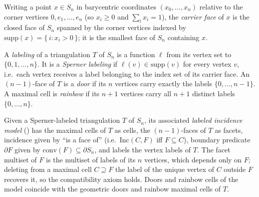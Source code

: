 \begin{definition}
    \label{def:carrier-face}
    \leanok
    Writing a point $x \in S_n$ in barycentric coordinates $(x_0, \dots, x_n)$
    relative to the corner vertices $0, e_1, \dots, e_n$ (so $x_i \ge 0$ and
    $\sum_i x_i = 1$), the \emph{carrier face} of $x$ is the closed face of $S_n$
    spanned by the corner vertices indexed by
    $\mathrm{supp}(x) = \{\, i : x_i > 0 \,\}$; it is the smallest face of $S_n$
    containing $x$.
\end{definition}

\begin{definition}
    \label{def:sperner-labeling}
    \leanok
    A \emph{labeling} of a triangulation $T$ of $S_n$ is a function $\ell$ from
    its vertex set to $\{0, 1, \dots, n\}$. It is a \emph{Sperner labeling} if
    $\ell(v) \in \mathrm{supp}(v)$ for every vertex $v$, i.e.\ each vertex
    receives a label belonging to the index set of its carrier face. An
    $(n-1)$-face of $T$ is a \emph{door} if its $n$ vertices carry exactly the
    labels $\{0, \dots, n-1\}$. A maximal cell is \emph{rainbow} if its $n+1$
    vertices carry all $n+1$ distinct labels $\{0, \dots, n\}$.
\end{definition}

\begin{definition}
    \label{def:triangulation-model}
    \leanok
    Given a Sperner-labeled triangulation $T$ of $S_n$, its associated
    \emph{labeled incidence model} () has the maximal
    cells of $T$ as cells, the $(n-1)$-faces of $T$ as facets, incidence given by
    ``is a face of'' (i.e.\ $\mathrm{Inc}(C, F)$ iff $F \subseteq C$), boundary
    predicate $\partial F$ given by $\mathrm{conv}(F) \subseteq \partial S_n$, and
    labels the vertex labels of $T$. The facet multiset of $F$ is the multiset of
    labels of its $n$ vertices, which depends only on $F$; deleting from a maximal
    cell $C \supseteq F$ the label of the unique vertex of $C$ outside $F$
    recovers it, so the compatibility axiom holds. Doors and rainbow cells of the
    model coincide with the geometric doors and rainbow maximal cells of $T$.
\end{definition}

